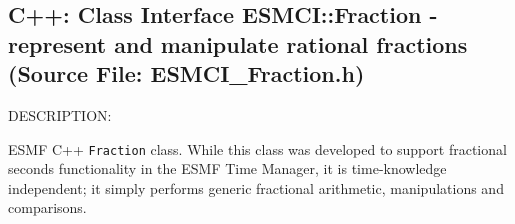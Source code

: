 
\setlength{\oldparskip}{\parskip}
\setlength{\parskip}{1.5ex}
\setlength{\oldparindent}{\parindent}
\setlength{\parindent}{0pt}
\setlength{\oldbaselineskip}{\baselineskip}
\setlength{\baselineskip}{11pt}
 
\def\bv{\begin{verbatim}}
\def\ev{\end{verbatim}}
\def\be{\begin{equation}}
\def\ee{\end{equation}}
\def\bea{\begin{eqnarray}}
\def\eea{\end{eqnarray}}
\def\bi{\begin{itemize}}
\def\ei{\end{itemize}}
\def\bn{\begin{enumerate}}
\def\en{\end{enumerate}}
\def\bd{\begin{description}}
\def\ed{\end{description}}
\def\({\left (}
\def\){\right )}
\def\[{\left [}
\def\]{\right ]}
\def\<{\left  \langle}
\def\>{\right \rangle}
\def\cI{{\cal I}}
\def\diag{\mathop{\rm diag}}
\def\tr{\mathop{\rm tr}}


 

  \subsection{C++:  Class Interface ESMCI::Fraction - represent and manipulate rational fractions (Source File: ESMCI\_Fraction.h)}


  
{\sf DESCRIPTION:\\ }


        ESMF C++ {\tt Fraction} class.  While this class was developed
        to support fractional seconds functionality in the ESMF Time Manager,
        it is time-knowledge independent; it simply performs generic fractional
        arithmetic, manipulations and comparisons. 
  
